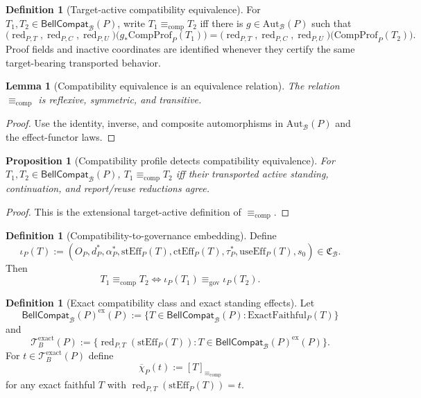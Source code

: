 \documentclass[11pt]{article}
\newtheorem{proposition}[theorem]{Proposition}
\newtheorem{lemma}[theorem]{Lemma}
\theoremstyle{definition}
\newtheorem{definition}[theorem]{Definition}
\newcommand{\Bell}{\mathcal{B}}
\newcommand{\AutBell}{\mathrm{Aut}_{\Bell}(P)}
\newcommand{\GovEq}{\equiv_{\mathrm{gov}}}
\newcommand{\CompEq}{\equiv_{\mathrm{comp}}}
\newcommand{\BellConstr}{\mathfrak{C}_{\Bell}}
\newcommand{\BellCompat}{\mathsf{BellCompat}_{\Bell}(P)}
\newcommand{\ExactFaithful}{\mathrm{ExactFaithful}_{P}}
\newcommand{\StandEff}{\mathrm{stEff}_{P}}
\newcommand{\ContEff}{\mathrm{ctEff}_{P}}
\newcommand{\ReuseEff}{\mathrm{useEff}_{P}}
\newcommand{\CompProf}{\mathrm{CompProf}_{P}}
\begin{document}
\begin{definition}[Target-active compatibility equivalence]\label{def:compatibilityequivalence}
For $T_1,T_2\in\BellCompat$, write $T_1\CompEq T_2$ iff there is $g\in\AutBell$ such that
\[
\bigl(\operatorname{red}_{P,T},\operatorname{red}_{P,C},\operatorname{red}_{P,U}\bigr)
\bigl(g_*\CompProf(T_1)\bigr)
=
\bigl(\operatorname{red}_{P,T},\operatorname{red}_{P,C},\operatorname{red}_{P,U}\bigr)
\bigl(\CompProf(T_2)\bigr).
\]
Proof fields and inactive coordinates are identified whenever they certify the same target-bearing transported behavior.
\end{definition}

\begin{lemma}[Compatibility equivalence is an equivalence relation]\label{lem:compatibilityequivalence}
The relation $\CompEq$ is reflexive, symmetric, and transitive.
\end{lemma}
\begin{proof}
Use the identity, inverse, and composite automorphisms in $\AutBell$ and the effect-functor laws.
\end{proof}

\begin{proposition}[Compatibility profile detects compatibility equivalence]\label{prop:standingeffectdetects}
For $T_1,T_2\in\BellCompat$, $T_1\CompEq T_2$ iff their transported active standing, continuation, and report/reuse reductions agree.
\end{proposition}
\begin{proof}
This is the extensional target-active definition of $\CompEq$.
\end{proof}

\begin{definition}[Compatibility-to-governance embedding]\label{def:compatembedding}
Define
\[
\iota_P(T):=(O_P,d_P^*,\alpha_P^*,\StandEff(T),\ContEff(T),\tau_P^*,\ReuseEff(T),s_0)\in\BellConstr.
\]
Then
\[
T_1\CompEq T_2\Longleftrightarrow\iota_P(T_1)\GovEq\iota_P(T_2).
\]
\end{definition}

\begin{definition}[Exact compatibility class and exact standing effects]\label{def:standingcompmap}
Let
\[
\BellCompat^{\mathrm{ex}}(P):=\{T\in\BellCompat:\ExactFaithful(T)\}
\]
and
\[
\mathscr T_B^{\mathrm{exact}}(P):=
\{\operatorname{red}_{P,T}(\StandEff(T)):T\in\BellCompat^{\mathrm{ex}}(P)\}.
\]
For $t\in\mathscr T_B^{\mathrm{exact}}(P)$ define
\[
\overline\chi_P(t):=[T]_{\CompEq}
\]
for any exact faithful $T$ with $\operatorname{red}_{P,T}(\StandEff(T))=t$.
\end{definition}
\end{document}
